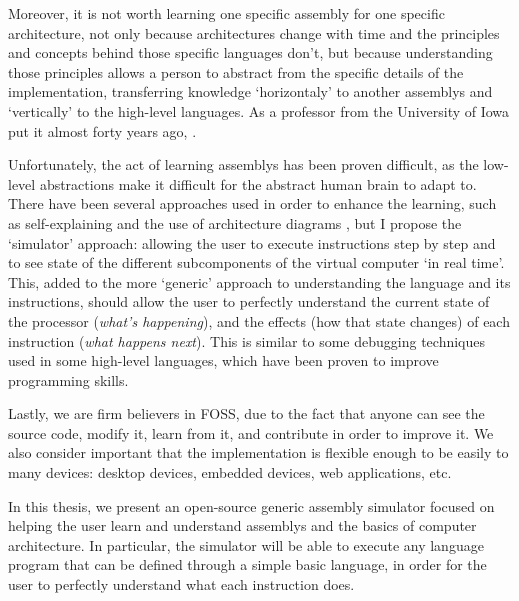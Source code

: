 Moreover, it is not worth learning one specific \gls{assembly} for one specific architecture, not only because architectures change with time and the principles and concepts behind those specific languages don't, but because understanding those principles allows a person to abstract from the specific details of the implementation, transferring knowledge `horizontaly' to another \glspl{assembly} and `vertically' to the \glspl{high-level language}. As a professor from the University of Iowa put it almost forty years ago, .


Unfortunately, the act of learning \glspl{assembly} has been proven difficult, as the low-level abstractions make it difficult for the abstract human brain to adapt to. There have been several approaches used in order to enhance the learning, such as self-explaining and the use of architecture diagrams \supercite{HungY.-C2012CSWC}, but I propose the `simulator' approach: allowing the user to execute instructions step by step and to see state of the different subcomponents of the virtual \gls{computer} `in real time'. This, added to the more `generic' approach to understanding the language and its instructions, should allow the user to perfectly understand the current state of the processor (\textit{what's happening}), and the effects (how that state changes) of each instruction (\textit{what happens next}). This is similar to some \gls{debugging} techniques used in some \glspl{high-level language}, which have been proven to improve programming skills\supercite{KLAHR1988362}.


Lastly, we are firm believers in \gls{FOSS}, due to the fact that anyone can see the source code, modify it, learn from it, and contribute in order to improve it. We also consider important that the implementation is flexible enough to be easily  to many devices: \glspl{desktop device}, \glspl{embedded device}, \glspl{web application}, etc.


In this thesis, we present an open-source generic \gls{assembly} simulator focused on helping the user learn and understand \glspl{assembly} and the basics of \gls{computer} architecture. In particular, the simulator will be able to execute any  language \gls{program} that can be defined through a simple basic  language, in order for the user to perfectly understand what each instruction does.



